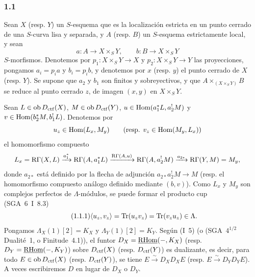 \subsubsection*{1.1}
Sean $X$ (resp. $Y$) un $S$-esquema que es la localización estricta en un punto cerrado de una $S$-curva lisa y separada, y $A$ (resp. $B$) un $S$-esquema estrictamente local, y sean
\[
a:A\longrightarrow X\times_S Y,
\qquad
b:B\longrightarrow X\times_S Y
\]
$S$-morfismos. Denotemos por $p_1:X\times_S Y\to X$ y $p_2:X\times_S Y\to Y$ las proyecciones, pongamos $a_i=p_i a$ y $b_i=p_i b$, y denotemos por $x$ (resp. $y$) el punto cerrado de $X$ (resp. $Y$). Se supone que $a_2$ y $b_1$ son finitos y sobreyectivos, y que $A\times_{(X\times_S Y)}B$ se reduce al punto cerrado $z$, de imagen $(x,y)$ en $X\times_S Y$.

Sean $L\in \operatorname{ob} D_{\mathrm{ctf}}(X)$, $M\in \operatorname{ob} D_{\mathrm{ctf}}(Y)$, $u\in\operatorname{Hom}(a_1^*L,a_2^!M)$ y $v\in\operatorname{Hom}(b_2^*M,b_1^!L)$. Denotemos por
\[
u_z\in\operatorname{Hom}(L_x,M_y)\qquad (\text{resp. }v_z\in\operatorname{Hom}(M_y,L_x))
\]
el homomorfismo compuesto
\[
L_x=\mathrm{R}\Gamma(X,L)\xrightarrow{a_1^*}\mathrm{R}\Gamma(A,a_1^*L)
\xrightarrow{\mathrm{R}\Gamma(A,u)}\mathrm{R}\Gamma(A,a_2^!M)
\xrightarrow{a_{2*}}\mathrm{R}\Gamma(Y,M)=M_y,
\]
donde $a_{2*}$ está definido por la flecha de adjunción $a_{2*}a_2^!M\to M$ (resp. el homomorfismo compuesto análogo definido mediante $(b,v)$). Como $L_x$ y $M_y$ son complejos perfectos de $\Lambda$-módulos, se puede formar el producto cup (SGA~6~I~8.3)
\begin{equation}\tag{1.1.1}
\langle u_z,v_z\rangle=\operatorname{Tr}(u_zv_z)=\operatorname{Tr}(v_zu_z)\in\Lambda.
\end{equation}
Pongamos $\Lambda_X(1)[2]=K_X$ y $\Lambda_Y(1)[2]=K_Y$. Según (I~5) (o (SGA~$4^{1/2}$ Dualité~1, o Finitude~4.1)), el funtor $D_X=\underline{\mathrm{RHom}}(-,K_X)$ (resp. $D_Y=\underline{\mathrm{RHom}}(-,K_Y)$) sobre $D_{\mathrm{ctf}}(X)$ (resp. $D_{\mathrm{ctf}}(Y)$) es dualizante, es decir, para todo $E\in\operatorname{ob} D_{\mathrm{ctf}}(X)$ (resp. $D_{\mathrm{ctf}}(Y)$), se tiene $E\xrightarrow{\sim}D_XD_XE$ (resp. $E\xrightarrow{\sim}D_YD_YE$). A veces escribiremos $D$ en lugar de $D_X$ o $D_Y$.

